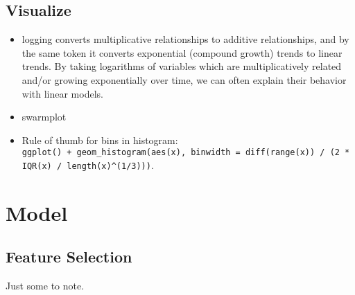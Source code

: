 \documentclass[]{book}
\theoremstyle{definition}
\theoremstyle{definition}
\theoremstyle{definition}
\theoremstyle{remark}
\begin{document}
\section{Visualize}\label{visualize}

\begin{itemize}
\item
  logging converts multiplicative relationships to additive
  relationships, and by the same token it converts exponential (compound
  growth) trends to linear trends. By taking logarithms of variables
  which are multiplicatively related and/or growing exponentially over
  time, we can often explain their behavior with linear models.
\item
  swarmplot
\item
  Rule of thumb for bins in histogram:
  \texttt{ggplot()\ +\ geom\_histogram(aes(x),\ binwidth\ =\ diff(range(x))\ /\ (2\ *\ IQR(x)\ /\ length(x)\^{}(1/3)))}.
\end{itemize}

\chapter{Model}\label{model}

\section{Feature Selection}\label{feature-selection}

Just some to note.
\end{document}
